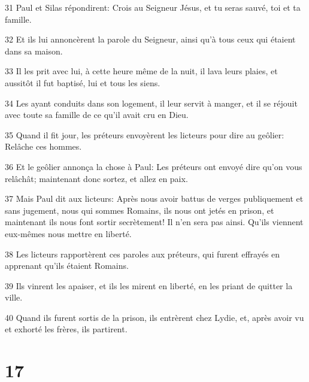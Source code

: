 \par 31 Paul et Silas répondirent: Crois au Seigneur Jésus, et tu seras sauvé, toi et ta famille.
\par 32 Et ils lui annoncèrent la parole du Seigneur, ainsi qu'à tous ceux qui étaient dans sa maison.
\par 33 Il les prit avec lui, à cette heure même de la nuit, il lava leurs plaies, et aussitôt il fut baptisé, lui et tous les siens.
\par 34 Les ayant conduits dans son logement, il leur servit à manger, et il se réjouit avec toute sa famille de ce qu'il avait cru en Dieu.
\par 35 Quand il fit jour, les préteurs envoyèrent les licteurs pour dire au geôlier: Relâche ces hommes.
\par 36 Et le geôlier annonça la chose à Paul: Les préteurs ont envoyé dire qu'on vous relâchât; maintenant donc sortez, et allez en paix.
\par 37 Mais Paul dit aux licteurs: Après nous avoir battus de verges publiquement et sans jugement, nous qui sommes Romains, ils nous ont jetés en prison, et maintenant ils nous font sortir secrètement! Il n'en sera pas ainsi. Qu'ils viennent eux-mêmes nous mettre en liberté.
\par 38 Les licteurs rapportèrent ces paroles aux préteurs, qui furent effrayés en apprenant qu'ils étaient Romains.
\par 39 Ils vinrent les apaiser, et ils les mirent en liberté, en les priant de quitter la ville.
\par 40 Quand ils furent sortis de la prison, ils entrèrent chez Lydie, et, après avoir vu et exhorté les frères, ils partirent.

\chapter{17}

